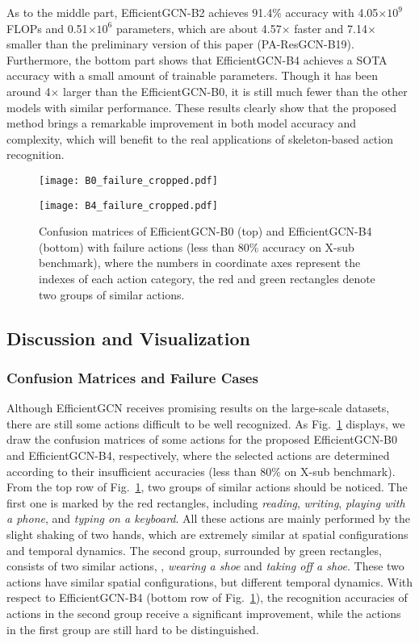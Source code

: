 \documentclass[10pt,journal,compsoc]{IEEEtran}
\begin{document}
As to the middle part, EfficientGCN-B2 achieves 91.4\% accuracy with 4.05$\times10^9$ FLOPs and 0.51$\times10^6$ parameters, which are about 4.57$\times$ faster and 7.14$\times$ smaller than the preliminary version of this paper (PA-ResGCN-B19). Furthermore, the bottom part shows that EfficientGCN-B4 achieves a SOTA accuracy with a small amount of trainable parameters. Though it has been around 4$\times$ larger than the EfficientGCN-B0, it is still much fewer than the other models with similar performance. These results clearly show that the proposed method brings a remarkable improvement in both model accuracy and complexity, which will benefit to the real applications of skeleton-based action recognition.

\begin{figure}[t]
  \centerline{\texttt{[image: B0\_failure\_cropped.pdf]}}
  \centerline{\texttt{[image: B4\_failure\_cropped.pdf]}}
  \vspace{-0.4cm}
  \caption{Confusion matrices of EfficientGCN-B0 (top) and EfficientGCN-B4 (bottom) with failure actions (less than 80\% accuracy on X-sub benchmark), where the numbers in coordinate axes represent the indexes of each action category, the {\color{red}red} and {\color{darkgreen}green} rectangles denote two groups of similar actions. \bv}\label{fig:cm}
\end{figure}

\subsection{Discussion and Visualization}
\label{ssec:discuss}

\subsubsection{Confusion Matrices and Failure Cases}
\label{sssec:failure}

Although EfficientGCN receives promising results on the large-scale datasets, there are still some actions difficult to be well recognized. As Fig.~\ref{fig:cm} displays, we draw the confusion matrices of some actions for the proposed EfficientGCN-B0 and EfficientGCN-B4, respectively, where the selected actions are determined according to their insufficient accuracies (less than 80\% on X-sub benchmark). From the top row of Fig.~\ref{fig:cm}, two groups of similar actions should be noticed. The first one is marked by the red rectangles, including {\it reading}, {\it writing}, {\it playing with a phone}, and {\it typing on a keyboard}. All these actions are mainly performed by the slight shaking of two hands, which are extremely similar at spatial configurations and temporal dynamics. The second group, surrounded by green rectangles, consists of two similar actions, \ie, {\it wearing a shoe} and {\it taking off a shoe}. These two actions have similar spatial configurations, but different temporal dynamics. With respect to EfficientGCN-B4 (bottom row of Fig.~\ref{fig:cm}), the recognition accuracies of actions in the second group receive a significant improvement, while the actions in the first group are still hard to be distinguished.
\end{document}
